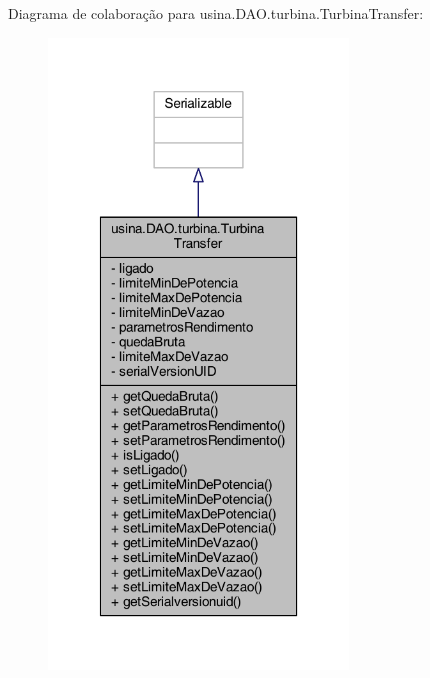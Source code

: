 Diagrama de colaboração para usina.\-D\-A\-O.\-turbina.\-Turbina\-Transfer\-:\nopagebreak
\begin{figure}[H]
\begin{center}
\leavevmode
\includegraphics[width=226pt]{classusina_1_1_d_a_o_1_1turbina_1_1_turbina_transfer__coll__graph}
\end{center}
\end{figure}
